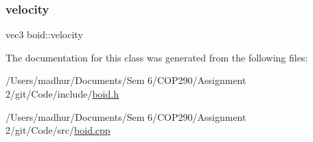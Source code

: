 \mbox{\label{classboid_a3493756cee09f08fd9cd2a49e8891b55}} 
\subsubsection{\texorpdfstring{velocity}{velocity}}
{\footnotesize\ttfamily vec3 boid\+::velocity\hspace{0.3cm}{\ttfamily [private]}}



The documentation for this class was generated from the following files\+:\begin{DoxyCompactItemize}
\item 
/\+Users/madhur/\+Documents/\+Sem 6/\+C\+O\+P290/\+Assignment 2/git/\+Code/include/\mbox{\hyperlink{boid_8h}{boid.\+h}}\item 
/\+Users/madhur/\+Documents/\+Sem 6/\+C\+O\+P290/\+Assignment 2/git/\+Code/src/\mbox{\hyperlink{boid_8cpp}{boid.\+cpp}}\end{DoxyCompactItemize}
